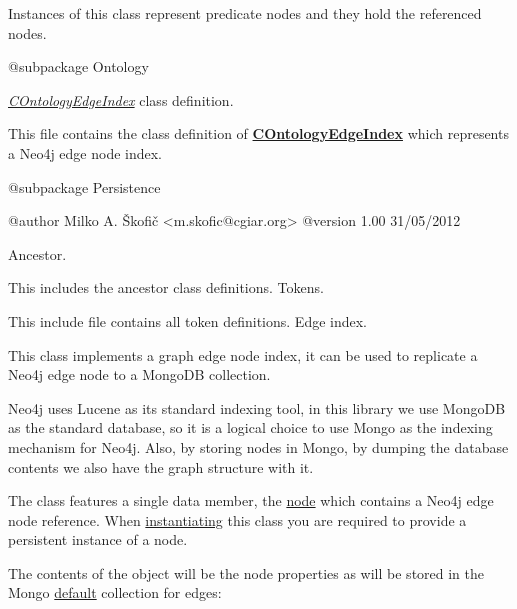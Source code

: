 Instances of this class represent predicate nodes and they hold the referenced nodes.

\begin{DoxyVerb} @subpackage        Ontology\end{DoxyVerb}


{\itshape \hyperlink{class_c_ontology_edge_index}{C\-Ontology\-Edge\-Index}} class definition.

This file contains the class definition of {\bfseries \hyperlink{class_c_ontology_edge_index}{C\-Ontology\-Edge\-Index}} which represents a Neo4j edge node index.

\begin{DoxyVerb} @subpackage        Persistence

 @author            Milko A. Škofič <m.skofic@cgiar.org>
 @version   1.00 31/05/2012\end{DoxyVerb}


Ancestor.

This includes the ancestor class definitions. Tokens.

This include file contains all token definitions. Edge index.

This class implements a graph edge node index, it can be used to replicate a Neo4j edge node to a Mongo\-D\-B collection.

Neo4j uses Lucene as its standard indexing tool, in this library we use Mongo\-D\-B as the standard database, so it is a logical choice to use Mongo as the indexing mechanism for Neo4j. Also, by storing nodes in Mongo, by dumping the database contents we also have the graph structure with it.

The class features a single data member, the \hyperlink{}{node} which contains a Neo4j edge node reference. When \hyperlink{}{instantiating} this class you are required to provide a persistent instance of a node.

The contents of the object will be the node properties as will be stored in the Mongo \hyperlink{}{default} collection for edges\-:


